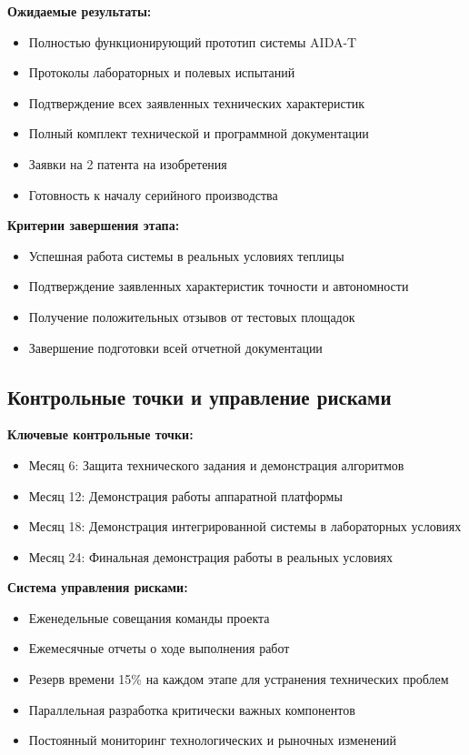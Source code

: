 \documentclass[12pt,a4paper]{article}
\begin{document}
\textbf{Ожидаемые результаты:}
\begin{itemize}
    \item Полностью функционирующий прототип системы AIDA-T
    \item Протоколы лабораторных и полевых испытаний
    \item Подтверждение всех заявленных технических характеристик
    \item Полный комплект технической и программной документации
    \item Заявки на 2 патента на изобретения
    \item Готовность к началу серийного производства
\end{itemize}

\textbf{Критерии завершения этапа:}
\begin{itemize}
    \item Успешная работа системы в реальных условиях теплицы
    \item Подтверждение заявленных характеристик точности и автономности
    \item Получение положительных отзывов от тестовых площадок
    \item Завершение подготовки всей отчетной документации
\end{itemize}

\subsection{Контрольные точки и управление рисками}

\textbf{Ключевые контрольные точки:}
\begin{itemize}
    \item Месяц 6: Защита технического задания и демонстрация алгоритмов
    \item Месяц 12: Демонстрация работы аппаратной платформы
    \item Месяц 18: Демонстрация интегрированной системы в лабораторных условиях
    \item Месяц 24: Финальная демонстрация работы в реальных условиях
\end{itemize}

\textbf{Система управления рисками:}
\begin{itemize}
    \item Еженедельные совещания команды проекта
    \item Ежемесячные отчеты о ходе выполнения работ
    \item Резерв времени 15\% на каждом этапе для устранения технических проблем
    \item Параллельная разработка критически важных компонентов
    \item Постоянный мониторинг технологических и рыночных изменений
\end{itemize}
\end{document}
